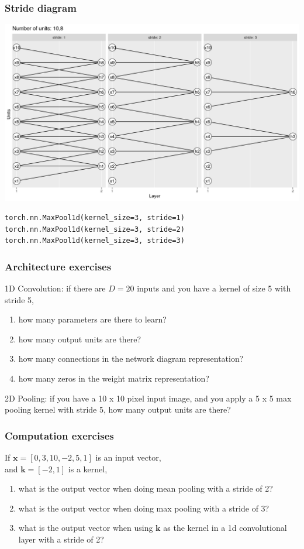 \documentclass{beamer}
\begin{document}
\begin{frame}[fragile]
  \frametitle{Stride diagram}
  \includegraphics[width=\textwidth]{figure-pooling-10-3}
\begin{verbatim}
torch.nn.MaxPool1d(kernel_size=3, stride=1)
torch.nn.MaxPool1d(kernel_size=3, stride=2)
torch.nn.MaxPool1d(kernel_size=3, stride=3)
\end{verbatim}
\end{frame}

\begin{frame}
  \frametitle{Architecture exercises}
  1D Convolution: if there are $D=20$ inputs and you have a kernel of
  size 5 with stride 5,
  \begin{enumerate}
  \item how many parameters are there to learn?
  \item how many output units are there?
  \item how many connections in the network diagram
    representation?
  \item how many zeros in the weight matrix
    representation?
  \end{enumerate}
  2D Pooling: if you have a 10 x 10 pixel input image, and you apply a
  5 x 5 max pooling kernel with stride 5, how many output units are
  there?
\end{frame}

\begin{frame}
  \frametitle{Computation exercises}
  If $\mathbf x = [0, 3, 10, -2, 5, 1]$ is an input vector,\\
  and $\mathbf k = [-2, 1]$ is a kernel,\\
  \begin{enumerate}
  \item what is the output vector when doing mean pooling with a stride of 2?
  \item what is the output vector when doing max pooling with a stride of 3?
  \item what is the output vector when using $\mathbf k$ as the kernel
    in a 1d convolutional layer with a stride of 2?
  \end{enumerate}
\end{frame}
\end{document}
